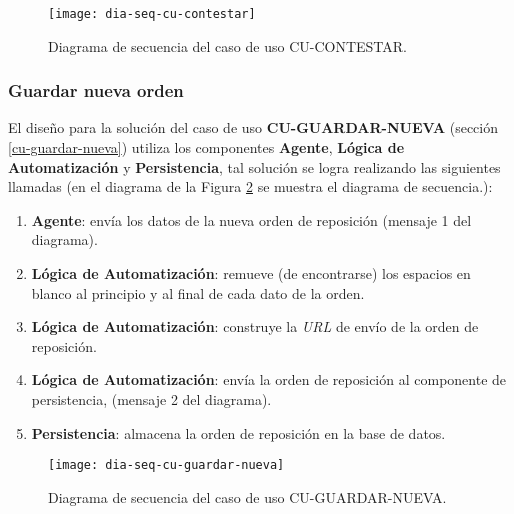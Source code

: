 \begin{figure}[h]
	\centering
	\texttt{[image: dia-seq-cu-contestar]}
	\caption{Diagrama de secuencia del caso de uso CU-CONTESTAR.}
	\label{fig:dia-seq-cu-contestar}
\end{figure}

\subsubsection{Guardar nueva orden}
El diseño para la solución del caso de uso \textbf{CU-GUARDAR-NUEVA} (sección \ref{cu-guardar-nueva}) utiliza los componentes \textbf{Agente}, \textbf{Lógica de Automatización} y \textbf{Persistencia}, tal solución se logra realizando las siguientes llamadas (en el diagrama de la Figura \ref{fig:dia-seq-cu-guardar-nueva} se muestra el diagrama de secuencia.):
\begin{enumerate}
	\item \textbf{Agente}: envía los datos de la nueva orden de reposición (mensaje 1 del diagrama).
	\item \textbf{Lógica de Automatización}: remueve (de encontrarse) los espacios en blanco al principio y al final de cada dato de la orden.
	\item \textbf{Lógica de Automatización}: construye la \textit{URL} de envío de la orden de reposición.
	\item \textbf{Lógica de Automatización}: envía la orden de reposición al componente de persistencia, (mensaje 2 del diagrama).
	\item \textbf{Persistencia}: almacena la orden de reposición en la base de datos.
\end{enumerate}

\begin{figure}[h]
	\centering
	\texttt{[image: dia-seq-cu-guardar-nueva]}
	\caption{Diagrama de secuencia del caso de uso CU-GUARDAR-NUEVA.}
	\label{fig:dia-seq-cu-guardar-nueva}
\end{figure}

